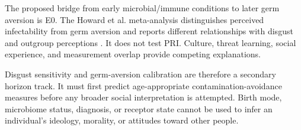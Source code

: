 The proposed bridge from early microbial/immune conditions to later germ aversion is E0. The Howard et al. meta-analysis distinguishes perceived infectability from germ aversion and reports different relationships with disgust and outgroup perceptions \cite{ref7}. It does not test PRI. Culture, threat learning, social experience, and measurement overlap provide competing explanations.

Disgust sensitivity and germ-aversion calibration are therefore a secondary horizon track. It must first predict age-appropriate contamination-avoidance measures before any broader social interpretation is attempted. Birth mode, microbiome status, diagnosis, or receptor state cannot be used to infer an individual's ideology, morality, or attitudes toward other people.
